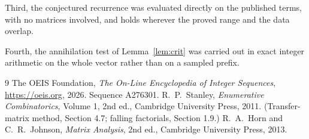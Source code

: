 \documentclass[11pt,a4paper]{article}
\theoremstyle{plain}
\theoremstyle{definition}
\begin{document}
Third, the conjectured recurrence was evaluated directly on the published terms, with no
matrices involved, and holds wherever the proved range and the data overlap.

Fourth, the annihilation test of Lemma~\ref{lem:crit} was carried out in exact integer
arithmetic on the whole vector rather than on a sampled prefix.

\begin{thebibliography}{9}
 The OEIS Foundation, \emph{The On-Line Encyclopedia of Integer
Sequences}, \url{https://oeis.org}, 2026. Sequence A276301.
 R.~P.~Stanley, \emph{Enumerative Combinatorics}, Volume 1, 2nd ed.,
Cambridge University Press, 2011. (Transfer-matrix method, Section 4.7; falling factorials,
Section 1.9.)
 R.~A.~Horn and C.~R.~Johnson, \emph{Matrix Analysis}, 2nd ed., Cambridge
University Press, 2013.
\end{thebibliography}
\end{document}
